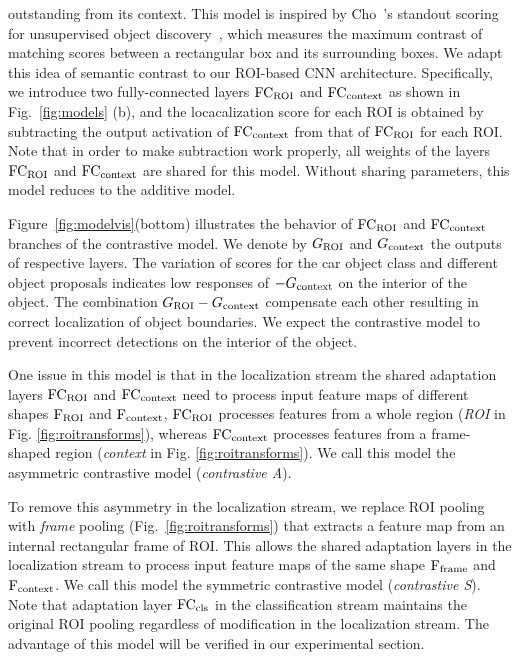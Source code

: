 \documentclass[runningheads]{llncs}
\begin{document}
outstanding from its context.  This model is inspired by Cho~\etal's
standout scoring for unsupervised object discovery~\cite{Cho:2015vz}, which
measures the maximum contrast of matching scores between a rectangular box and
its surrounding boxes. We adapt this idea of semantic contrast to our ROI-based
CNN architecture. Specifically, we introduce two fully-connected layers ${\rm FC_{ROI}}$ and ${\rm FC_{context}}$ as shown in Fig.~\ref{fig:models} (b), and the locacalization score for each ROI is obtained by subtracting the output activation of ${\rm FC_{context}}$ from that of ${\rm FC_{ROI}}$ for each ROI.
Note that in order to make subtraction work properly, all weights of the layers ${\rm
FC_{ROI}}$ and ${\rm FC_{context}}$ are shared for this model. Without sharing parameters, this model reduces to the additive model.  %

Figure~\ref{fig:modelvis}(bottom) illustrates the behavior of ${\rm FC_{ROI}}$ and ${\rm FC_{context}}$
branches of the contrastive model. We denote by $G_{\rm ROI}$ and $G_{\rm context}$ the outputs of respective layers. The variation of scores for the car object
class and different object proposals indicates low responses of $-G_{\rm context}$
on the interior of the object. The combination $G_{\rm ROI}-G_{\rm context}$ compensate each other
resulting in correct localization of object boundaries. We expect the
contrastive model to prevent incorrect detections on the interior of the object.

One issue in this model is that in the localization stream the shared adaptation layers ${\rm FC_{ROI}}$ and ${\rm FC_{context}}$ need to process input feature maps of different shapes ${\rm F_{ROI}}$ and ${\rm F_{context}}$, \ie${\rm FC_{ROI}}$ processes features from a whole region ({\em ROI} in Fig. \ref{fig:roitransforms}), whereas ${\rm FC_{context}}$ processes features from a frame-shaped region ({\em context} in Fig. \ref{fig:roitransforms}). We call this model the asymmetric contrastive model ({\em contrastive A}).  

To remove this asymmetry in the localization stream, we replace ROI pooling with {\em frame} pooling (Fig.~\ref{fig:roitransforms}) that extracts a feature map from an internal rectangular frame of ROI. This allows the shared adaptation layers in the localization stream to process input feature maps of the same shape ${\rm F_{frame}}$ and ${\rm F_{context}}$. We call this model the symmetric contrastive model ({\em contrastive S}). Note that adaptation layer ${\rm
FC_{cls}}$ in the classification stream maintains the original ROI pooling 
regardless of modification in the localization stream. The advantage of this
model will be verified in our experimental section.  
\end{document}
